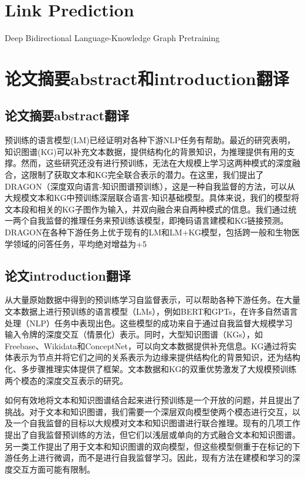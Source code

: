 \section*{Link Prediction}
Deep Bidirectional Language-Knowledge Graph Pretraining

\section{论文摘要abstract和introduction翻译}

\subsection{论文摘要abstract翻译}
预训练的语言模型(LM)已经证明对各种下游NLP任务有帮助。最近的研究表明，知识图谱(KG)可以补充文本数据，提供结构化的背景知识，为推理提供有用的支撑。然而，这些研究还没有进行预训练，无法在大规模上学习这两种模式的深度融合，这限制了获取文本和KG完全联合表示的潜力。在这里，我们提出了 DRAGON（深度双向语言-知识图谱预训练），这是一种自我监督的方法，可以从大规模文本和KG中预训练深层联合语言-知识基础模型。具体来说，我们的模型将文本段和相关的KG子图作为输入，并双向融合来自两种模式的信息。我们通过统一两个自我监督的推理任务来预训练该模型，即掩码语言建模和KG链接预测。DRAGON在各种下游任务上优于现有的LM和LM+KG模型，包括跨一般和生物医学领域的问答任务，平均绝对增益为+5%

\subsection{论文introduction翻译}
从大量原始数据中得到的预训练学习自监督表示，可以帮助各种下游任务。在大量文本数据上进行预训练的语言模型（LMs），例如BERT和GPTs，在许多自然语言处理（NLP）任务中表现出色。这些模型的成功来自于通过自我监督大规模学习输入令牌的深度交互（情景化）表示。同时，大型知识图谱（KGs），如Freebase、Wikidata和ConceptNet，可以向文本数据提供补充信息。KG通过将实体表示为节点并将它们之间的关系表示为边缘来提供结构化的背景知识，还为结构化、多步骤推理实体提供了框架。文本数据和KG的双重优势激发了大规模预训练两个模态的深度交互表示的研究。

如何有效地将文本和知识图谱结合起来进行预训练是一个开放的问题，并且提出了挑战。对于文本和知识图谱，我们需要一个深层双向模型使两个模态进行交互，以及一个自我监督的目标以大规模对文本和知识图谱进行联合推理。现有的几项工作提出了自我监督预训练的方法，但它们以浅层或单向的方式融合文本和知识图谱。另一类工作提出了用于文本和知识图谱的双向模型，但这些模型侧重于在标记的下游任务上进行微调，而不是进行自我监督学习。因此，现有方法在建模和学习的深度交互方面可能有限制。


